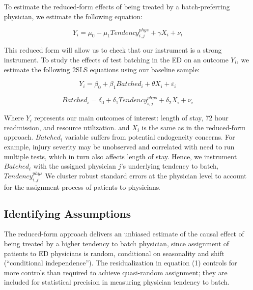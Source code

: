 \documentclass[,,nonblindrev]{informs}
\begin{document}
To estimate the reduced-form effects of being treated by a
batch-preferring physician, we estimate the following equation:

\begin{equation}
Y_i = \mu_0 + \mu_1 Tendency_{i,j}^{phys} + \gamma X_i + \nu_i
\end{equation}

This reduced form will allow us to check that our instrument is a strong
instrument. To study the effects of test batching in the ED on an
outcome \(Y_i\), we estimate the following 2SLS equations using our
baseline sample:

\begin{equation}
Y_i = \beta_0 + \beta_1 Batched_i + \theta X_i + \varepsilon_i
\end{equation}

\begin{equation}
Batched_i = \delta_0 + \delta_1 Tendency_{i,j}^{phys} + \delta_2 X_i + \nu_i
\end{equation}

Where \(Y_i\) represents our main outcomes of interest: length of stay,
72 hour readmission, and resource utilization. and \(X_i\) is the same
as in the reduced-form approach. \(Batched_i\) variable suffers from
potential endogeneity concerns. For example, injury severity may be
unobserved and correlated with need to run multiple tests, which in turn
also affects length of stay. Hence, we instrument \(Batched_i\) with the
assigned physician \(j\)'s underlying tendency to batch,
\(Tendency_{i,j}^{phys}\) We cluster robust standard errors at the
physician level to account for the assignment process of patients to
physicians.

\hypertarget{identifying-assumptions}{%
\subsection{Identifying Assumptions}\label{identifying-assumptions}}

The reduced-form approach delivers an unbiased estimate of the causal
effect of being treated by a higher tendency to batch physician, since
assignment of patients to ED physicians is random, conditional on
seasonality and shift (``conditional independence''). The
residualization in equation (1) controls for more controls than required
to achieve quasi-random assignment; they are included for statistical
precision in measuring physician tendency to batch.
\end{document}
